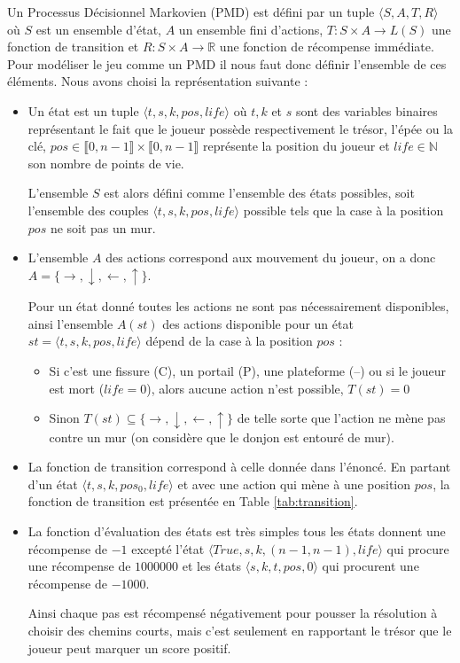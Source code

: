 \documentclass[a4paper]{article}
\theoremstyle{plain}
\begin{document}
Un Processus Décisionnel Markovien (PMD) est défini par un tuple $\langle S, A, T, R \rangle$ où $S$ est un ensemble d'état, $A$ un ensemble fini d'actions, $T : S \times A \rightarrow L(S)$ une fonction de transition et $R : S\times A \rightarrow \mathbb{R}$ une fonction de récompense immédiate. Pour modéliser le jeu comme un PMD il nous faut donc définir l'ensemble de ces éléments. Nous avons choisi la représentation suivante :
\begin{itemize}
	\item Un état est un tuple $\langle t, s, k, pos, life \rangle$ où $t, k$ et $s$ sont des variables binaires représentant le fait que le joueur possède respectivement le trésor, l'épée ou la clé, $pos \in \llbracket 0, n- 1\rrbracket \times \llbracket 0, n- 1\rrbracket$ représente la position du joueur et $life \in \mathbb{N}$ son nombre de points de vie.
	
	L'ensemble $S$ est alors défini comme l'ensemble des états possibles, soit l'ensemble des couples $\langle t, s, k, pos, life \rangle$ possible tels que la case à la position $pos$ ne soit pas un mur.
	
	\item L'ensemble $A$ des actions correspond aux mouvement du joueur, on a donc $A = \{\rightarrow, \downarrow, \leftarrow, \uparrow\}$.
	
	Pour un état donné toutes les actions ne sont pas nécessairement disponibles, ainsi l'ensemble $A(st)$ des actions disponible pour un état $st = \langle t, s, k, pos, life \rangle$ dépend de la case à la position $pos$ :
	\begin{itemize}
		\item Si c'est une fissure (C), un portail (P), une plateforme (--) ou si le joueur est mort ($life = 0$), alors aucune action n'est possible, $T(st) = 0$
		\item Sinon $T(st) \subseteq \{\rightarrow, \downarrow, \leftarrow, \uparrow\}$ de telle sorte que l'action ne mène pas contre un mur (on considère que le donjon est entouré de mur).
	\end{itemize}

	\item La fonction de transition correspond à celle donnée dans l'énoncé. En partant d'un état $\langle t, s, k, pos_0, life \rangle$ et avec une action qui mène à une position $pos$, la fonction de transition est présentée en Table \ref{tab:transition}.

	\item La fonction d'évaluation des états est très simples tous les états donnent une récompense de $-1$ excepté l'état $\langle True, s, k, (n - 1, n - 1), life \rangle$ qui procure une récompense de $1 000 000$ et les états $\langle s, k, t, pos, 0\rangle$ qui procurent une récompense de $-1000$.
	
	Ainsi chaque pas est récompensé négativement pour pousser la résolution à choisir des chemins courts, mais c'est seulement en rapportant le trésor que le joueur peut marquer un score positif.
\end{itemize}
\end{document}
